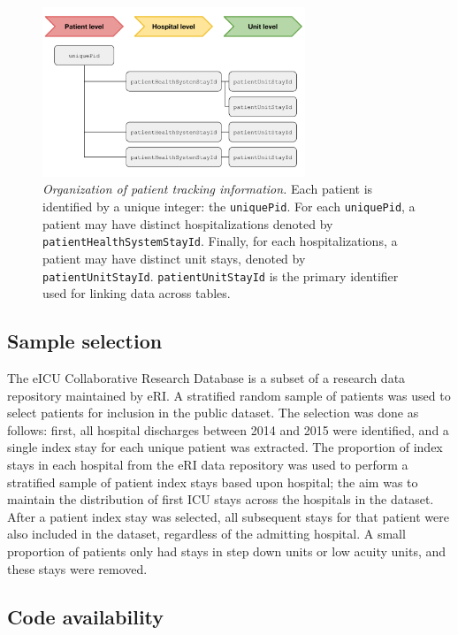 \documentclass[english]{article}
\newcommand{\colname}[1]{\texttt{#1}}
\begin{document}
\begin{figure}[htbp]
\centering
\includegraphics[width=0.70000\textwidth]{img/Patient_Organization}
\caption{\emph{Organization of patient tracking information.} Each patient is identified by a unique integer: the \colname{uniquePid}. For each \colname{uniquePid}, a patient may have distinct hospitalizations denoted by \colname{patientHealthSystemStayId}. Finally, for each hospitalizations, a patient may have distinct unit stays, denoted by \colname{patientUnitStayId}. \colname{patientUnitStayId} is the primary identifier used for linking data across tables. \label{fig:patient_organization}}
\end{figure}


\subsection*{Sample selection}\label{sample-selection}

The eICU Collaborative Research Database is a subset of a research data repository maintained by eRI.
A stratified random sample of patients was used to select patients for
inclusion in the public dataset. The selection was done as follows: first, all
hospital discharges between 2014 and 2015 were identified, and a single
index stay for each unique patient was extracted. The proportion of
index stays in each hospital from the eRI data repository was used to
perform a stratified sample of patient index stays based upon hospital;
the aim was to maintain the distribution of first ICU stays across the
hospitals in the dataset. After a patient index stay was selected, all
subsequent stays for that patient were also included in the dataset,
regardless of the admitting hospital. A small proportion of patients
only had stays in step down units or low acuity units, and these stays
were removed.

\subsection*{Code availability}
\end{document}

